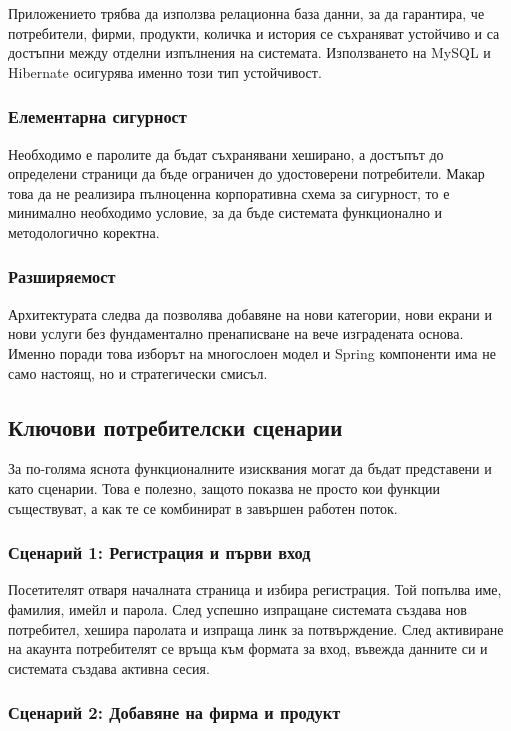 Приложението трябва да използва релационна база данни, за да гарантира, че потребители, фирми, продукти, количка и история се съхраняват устойчиво и са достъпни между отделни изпълнения на системата. Използването на MySQL и Hibernate осигурява именно този тип устойчивост.

\subsubsection{Елементарна сигурност}

Необходимо е паролите да бъдат съхранявани хеширано, а достъпът до определени страници да бъде ограничен до удостоверени потребители. Макар това да не реализира пълноценна корпоративна схема за сигурност, то е минимално необходимо условие, за да бъде системата функционално и методологично коректна.

\subsubsection{Разширяемост}

Архитектурата следва да позволява добавяне на нови категории, нови екрани и нови услуги без фундаментално пренаписване на вече изградената основа. Именно поради това изборът на многослоен модел и Spring компоненти има не само настоящ, но и стратегически смисъл.

\subsection{Ключови потребителски сценарии}

За по-голяма яснота функционалните изисквания могат да бъдат представени и като сценарии. Това е полезно, защото показва не просто кои функции съществуват, а как те се комбинират в завършен работен поток.

\subsubsection{Сценарий 1: Регистрация и първи вход}

Посетителят отваря началната страница и избира регистрация. Той попълва име, фамилия, имейл и парола. След успешно изпращане системата създава нов потребител, хешира паролата и изпраща линк за потвърждение. След активиране на акаунта потребителят се връща към формата за вход, въвежда данните си и системата създава активна сесия.

\subsubsection{Сценарий 2: Добавяне на фирма и продукт}


